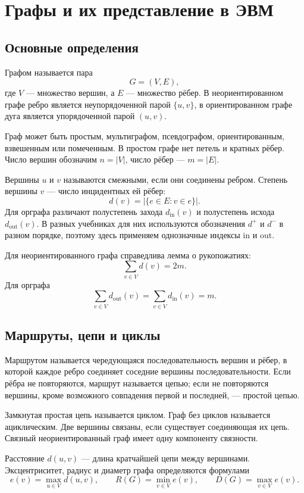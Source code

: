 \section{Графы и их представление в ЭВМ}
\label{sec:graphs-representation}

\subsection{Основные определения}

Графом называется пара
\[
    G=(V,E),
\]
где $V$ --- множество вершин, а $E$ --- множество рёбер. В неориентированном
графе ребро является неупорядоченной парой $\{u,v\}$, в ориентированном графе
дуга является упорядоченной парой $(u,v)$.

Граф может быть простым, мультиграфом, псевдографом, ориентированным,
взвешенным или помеченным. В простом графе нет петель и кратных рёбер.
Число вершин обозначим $n=|V|$, число рёбер --- $m=|E|$.

Вершины $u$ и $v$ называются смежными, если они соединены ребром. Степень
вершины $v$ --- число инцидентных ей рёбер:
\[
    d(v)=|\{e\in E: v\in e\}|.
\]
Для орграфа различают полустепень захода $d_{\mathrm{in}}(v)$ и полустепень
исхода $d_{\mathrm{out}}(v)$. В разных учебниках для них используются обозначения
$d^+$ и $d^-$ в разном порядке, поэтому здесь применяем однозначные индексы
$\mathrm{in}$ и $\mathrm{out}$.

Для неориентированного графа справедлива лемма о рукопожатиях:
\[
    \sum_{v\in V}d(v)=2m.
\]
Для орграфа
\[
    \sum_{v\in V}d_{\mathrm{out}}(v)
    =\sum_{v\in V}d_{\mathrm{in}}(v)=m.
\]

\subsection{Маршруты, цепи и циклы}

Маршрутом называется чередующаяся последовательность вершин и рёбер, в которой
каждое ребро соединяет соседние вершины последовательности. Если рёбра не
повторяются, маршрут называется цепью; если не повторяются вершины, кроме
возможного совпадения первой и последней, --- простой цепью.

Замкнутая простая цепь называется циклом. Граф без циклов называется
ациклическим. Две вершины связаны, если существует соединяющая их цепь.
Связный неориентированный граф имеет одну компоненту связности.

Расстояние $d(u,v)$ --- длина кратчайшей цепи между вершинами. Эксцентриситет,
радиус и диаметр графа определяются формулами
\[
 e(v)=\max_{u\in V}d(u,v),\qquad
 R(G)=\min_{v\in V}e(v),\qquad
 D(G)=\max_{v\in V}e(v).
\]

